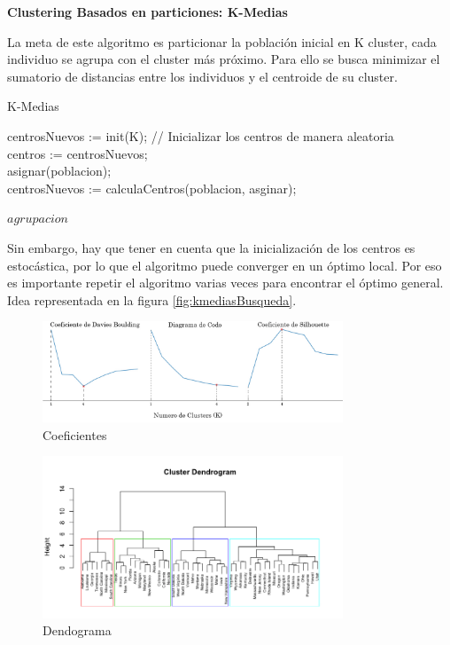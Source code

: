 \noindent \textbf{Clustering Basados en particiones: K-Medias}

La meta de este algoritmo es particionar la población inicial en K cluster, cada individuo se agrupa con el cluster más próximo. Para ello se busca minimizar el sumatorio de distancias entre los individuos y el centroide de su cluster. 


\begin{algorithm}[!h]
	\caption{K-Medias}
	centrosNuevos := init(K); // Inicializar los centros de manera aleatoria\\
	centros := centrosNuevos;\\
	{
		asignar(poblacion);\\
		centrosNuevos := calculaCentros(poblacion, asginar);		
	}
	
	
	\Return $agrupacion$\;
\end{algorithm}

Sin embargo, hay que tener en cuenta que la inicialización de los centros es estocástica, por lo que el algoritmo puede converger en un óptimo local. Por eso es importante repetir el algoritmo varias veces para encontrar el óptimo general. Idea representada en la figura \ref{fig:kmediasBusqueda}.

\newpage


\begin{figure}[!h]
	\centering
	\includegraphics[width=0.8\textwidth]{images/chapter_2/ap_nosup_diagramas}
	\caption{Coeficientes}
	\label{fig:coeficientes}
\end{figure}


\begin{figure}[!h]
	\centering
	\includegraphics[width=0.8\textwidth]{images/chapter_2/dendograma}
	\caption{Dendograma}
	\label{fig:dendograma}
\end{figure}

